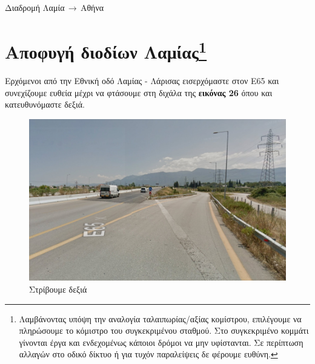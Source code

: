 \begin{center}
\begin{huge}
Διαδρομή Λαμία$\,\to\,$Αθήνα
\end{huge}
\section*{Αποφυγή διοδίων Λαμίας\footnote{Λαμβάνοντας υπόψη την αναλογία ταλαιπωρίας/αξίας κομίστρου, επιλέγουμε να πληρώσουμε το κόμιστρο του συγκεκριμένου σταθμού. Στο συγκεκριμένο κομμάτι γίνονται έργα και ενδεχομένως κάποιοι δρόμοι να μην υφίστανται. Σε περίπτωση αλλαγών στο οδικό δίκτυο ή για τυχόν παραλείψεις δε φέρουμε ευθύνη.}}
\end{center}
Ερχόμενοι από την Εθνική οδό Λαμίας - Λάρισας εισερχόμαστε στον Ε65 και συνεχίζουμε ευθεία μέχρι να φτάσουμε στη διχάλα της \textbf{εικόνας 26} όπου και κατευθυνόμαστε δεξιά.
 
\begin{figure}[H]
\includegraphics[width=\textwidth]{images/lamia-athina/lamia/lamia_002.jpg} 
\caption{Στρίβουμε δεξιά} 
\end{figure}

